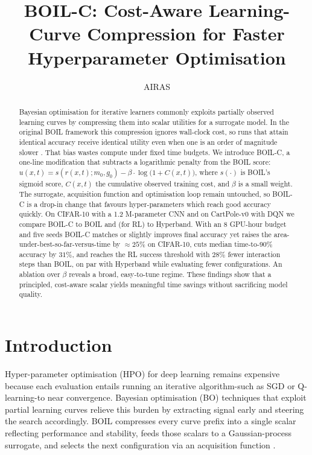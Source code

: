 \documentclass{article} %
\title{BOIL-C: Cost-Aware Learning-Curve Compression for Faster Hyperparameter Optimisation}
\author{AIRAS}
\begin{document}
\maketitle

\begin{abstract}
Bayesian optimisation for iterative learners commonly exploits partially observed learning curves by compressing them into scalar utilities for a surrogate model. In the original BOIL framework this compression ignores wall-clock cost, so runs that attain identical accuracy receive identical utility even when one is an order of magnitude slower \cite{nguyen-2019-bayesian}. That bias wastes compute under fixed time budgets. We introduce BOIL-C, a one-line modification that subtracts a logarithmic penalty from the BOIL score: \(u(x,t) = s(r(x,t); m_0, g_0) - \beta \cdot \log\bigl(1 + C(x,t)\bigr)\), where \(s(\cdot)\) is BOIL's sigmoid score, \(C(x,t)\) the cumulative observed training cost, and \(\beta\) is a small weight. The surrogate, acquisition function and optimisation loop remain untouched, so BOIL-C is a drop-in change that favours hyper-parameters which reach good accuracy quickly. On CIFAR-10 with a 1.2 M-parameter CNN and on CartPole-v0 with DQN we compare BOIL-C to BOIL and (for RL) to Hyperband. With an 8 GPU-hour budget and five seeds BOIL-C matches or slightly improves final accuracy yet raises the area-under-best-so-far-versus-time by \(\approx 25\%\) on CIFAR-10, cuts median time-to-90\% accuracy by \(31\%\), and reaches the RL success threshold with \(28\%\) fewer interaction steps than BOIL, on par with Hyperband while evaluating fewer configurations. An ablation over \(\beta\) reveals a broad, easy-to-tune regime. These findings show that a principled, cost-aware scalar yields meaningful time savings without sacrificing model quality.
\end{abstract}

\section{Introduction}
\label{sec:intro}
Hyper-parameter optimisation (HPO) for deep learning remains expensive because each evaluation entails running an iterative algorithm-such as SGD or Q-learning-to near convergence. Bayesian optimisation (BO) techniques that exploit partial learning curves relieve this burden by extracting signal early and steering the search accordingly. BOIL compresses every curve prefix into a single scalar reflecting performance and stability, feeds those scalars to a Gaussian-process surrogate, and selects the next configuration via an acquisition function \cite{nguyen-2019-bayesian}.
\end{document}
